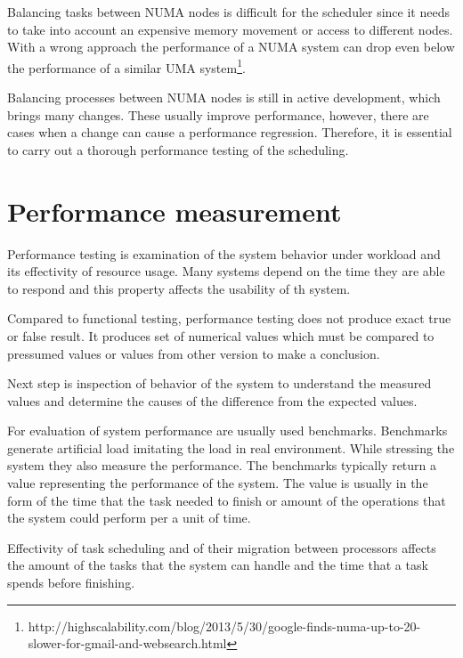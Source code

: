 Balancing tasks between NUMA nodes is difficult for the scheduler since it needs
to take into account an expensive memory movement or access to different nodes.
With a wrong approach the performance of a NUMA system can drop even below the
performance of a similar UMA
system\footnote{http://highscalability.com/blog/2013/5/30/google-finds-numa-up-to-20-slower-for-gmail-and-websearch.html}.

Balancing processes between NUMA nodes is still in active development, which
brings many changes. These usually improve performance, however, there are cases
when a change can cause a performance regression. Therefore, it is essential to
carry out a thorough performance testing of the scheduling.




\chapter{Performance measurement}
Performance testing is examination of the system behavior under workload and its
effectivity of resource usage. Many systems depend on the time they are able to
respond and this property affects the usability of th system.

Compared to functional testing, performance testing does not produce exact true
or false result. It produces set of numerical values which must be compared to
pressumed values or values from other version to make a conclusion.

Next step is inspection of behavior of the system to understand the measured
values and determine the causes of the difference from the expected values.

For evaluation of system performance are usually used benchmarks.
Benchmarks generate artificial load imitating the load in real environment.
While stressing the system they also measure the performance. The benchmarks
typically return a value representing the performance of the system. The value
is usually in the form of the time that the task needed to finish or amount of
the operations that the system could perform per a unit of time.

Effectivity of task scheduling and of their migration between processors affects
the amount of the tasks that the system can handle and the time that a task
spends before finishing.

